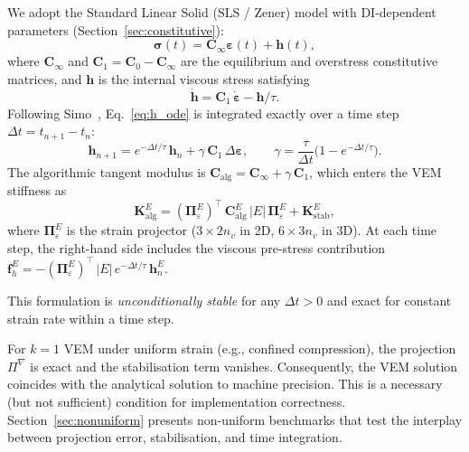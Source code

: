 \documentclass[smallextended]{svjour3}
\newcommand{\vect}[1]{\bm{#1}}
\newcommand{\mat}[1]{\mathbf{#1}}
\renewcommand{\tens}[1]{\boldsymbol{#1}}
\begin{document}
We adopt the Standard Linear Solid (SLS / Zener) model with
DI-dependent parameters (Section~\ref{sec:constitutive}):
\begin{equation}
  \tens{\sigma}(t) = \mat{C}_\infty \tens{\varepsilon}(t) + \vect{h}(t),
  \label{eq:sls_stress}
\end{equation}
where $\mat{C}_\infty$ and $\mat{C}_1 = \mat{C}_0 - \mat{C}_\infty$
are the equilibrium and overstress constitutive matrices, and
$\vect{h}$ is the internal viscous stress satisfying
\begin{equation}
  \dot{\vect{h}} = \mat{C}_1\,\dot{\tens{\varepsilon}} - \vect{h}/\tau.
  \label{eq:h_ode}
\end{equation}
Following Simo~\cite{Simo1987}, Eq.~\eqref{eq:h_ode} is integrated
exactly over a time step $\Delta t = t_{n+1} - t_n$:
\begin{equation}
  \vect{h}_{n+1} = e^{-\Delta t/\tau}\,\vect{h}_n
  + \gamma\,\mat{C}_1\,\Delta\tens{\varepsilon},
  \qquad
  \gamma = \frac{\tau}{\Delta t}\bigl(1 - e^{-\Delta t/\tau}\bigr).
  \label{eq:simo_update}
\end{equation}
The algorithmic tangent modulus is
$\mat{C}_\mathrm{alg} = \mat{C}_\infty + \gamma\,\mat{C}_1$,
which enters the VEM stiffness as
\begin{equation}
  \mat{K}_\mathrm{alg}^E
  = (\tens{\Pi}_\varepsilon^E)^\top\,
    \mat{C}_\mathrm{alg}^E\,|E|\,
    \tens{\Pi}_\varepsilon^E
  + \mat{K}_\mathrm{stab}^E,
  \label{eq:K_alg}
\end{equation}
where $\tens{\Pi}_\varepsilon^E$ is the strain projector
($3 \times 2n_v$ in 2D, $6 \times 3n_v$ in 3D).
At each time step, the right-hand side includes the viscous
pre-stress contribution
$\vect{f}_h^E = -(\tens{\Pi}_\varepsilon^E)^\top\,|E|\,
e^{-\Delta t/\tau}\,\vect{h}_n^E$.

This formulation is \emph{unconditionally stable} for any $\Delta t > 0$
and exact for constant strain rate within a time step.

\begin{remark}
\label{rem:machprec}
For $k{=}1$ VEM under uniform strain (e.g., confined compression),
the projection $\Pi^\nabla$ is exact and the stabilisation term
vanishes.
Consequently, the VEM solution coincides with the analytical
solution to machine precision.
This is a necessary (but not sufficient) condition for implementation
correctness.
Section~\ref{sec:nonuniform} presents non-uniform benchmarks that
test the interplay between projection error, stabilisation, and time
integration.
\end{remark}
\end{document}
